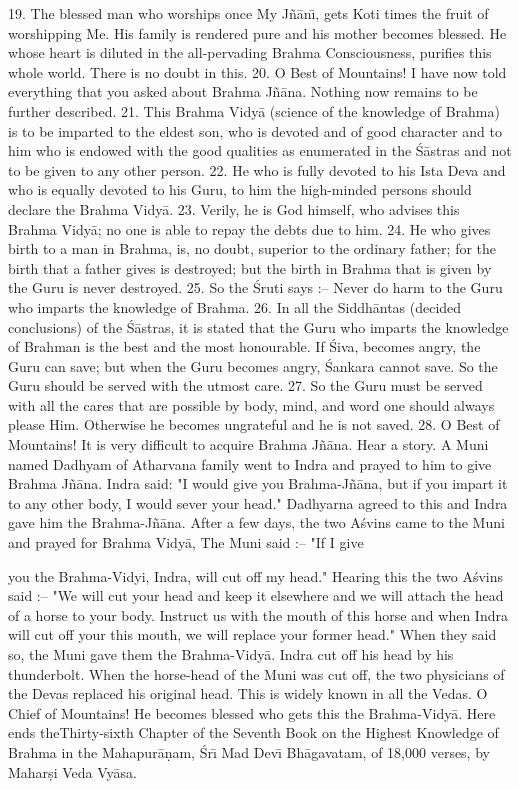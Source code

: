 19. The blessed man who worships once My J\~n\=an\={\i}, gets Koti times the fruit of worshipping Me. His family is rendered pure and his mother becomes blessed. He whose heart is diluted in the all-pervading Brahma Consciousness, purifies this whole world. There is no doubt in this.
20. O Best of Mountains! I have now told everything that you asked about Brahma J\~n\=ana. Nothing now remains to be further described.
21. This Brahma Vidy\=a (science of the knowledge of Brahma) is to be imparted to the eldest son, who is devoted and of good character and to him who is endowed with the good qualities as enumerated in the \'S\=astras and not to be given to any other person.
22. He who is fully devoted to his Ista Deva and who is equally devoted to his Guru, to him the high-minded persons should declare the Brahma Vidy\=a.
23. Verily, he is God himself, who advises this Brahma Vidy\=a; no one is able to repay the debts due to him.
24. He who gives birth to a man in Brahma, is, no doubt, superior to the ordinary father; for the birth that a father gives is destroyed; but the birth in Brahma that is given by the Guru is never destroyed.
25. So the \'Sruti says :-- Never do harm to the Guru who imparts the knowledge of Brahma.
26. In all the Siddh\=antas (decided conclusions) of the \'S\=astras, it is stated that the Guru who imparts the knowledge of Brahman is the best and the most honourable. If \'Siva, becomes angry, the Guru can save; but when the Guru becomes angry, \'Sankara cannot save. So the Guru should be served with the utmost care.
27. So the Guru must be served with all the cares that are possible by body, mind, and word one should always please Him. Otherwise he becomes ungrateful and he is not saved.
28. O Best of Mountains! It is very difficult to acquire Brahma J\~n\=ana. Hear a story. A Muni named Dadhyam of Atharvana family went to Indra and prayed to him to give Brahma J\~n\=ana. Indra said: "I would give you Brahma-J\~n\=ana, but if you impart it to any other body, I would sever your head." Dadhyarna agreed to this and Indra gave him the Brahma-J\~n\=ana. After a few days, the two A\'svins came to the Muni and prayed for Brahma Vidy\=a, The Muni said :-- "If I give

you the Brahma-Vidyi, Indra, will cut off my head." Hearing this the two A\'svins said :-- "We will cut your head and keep it elsewhere and we will attach the head of a horse to your body. Instruct us with the mouth of this horse and when Indra will cut off your this mouth, we will replace your former head." When they said so, the Muni gave them the Brahma-Vidy\=a. Indra cut off his head by his thunderbolt. When the horse-head of the Muni was cut off, the two physicians of the Devas replaced his original head. This is widely known in all the Vedas.
O Chief of Mountains! He becomes blessed who gets this the Brahma-Vidy\=a.
Here ends theThirty-sixth Chapter of the Seventh Book on the Highest Knowledge of Brahma in the Mahapur\=a\d{n}am, \'Sr\={\i} Mad Dev\={\i} Bh\=agavatam, of 18,000 verses, by Mahar\d{s}i Veda Vy\=asa.



